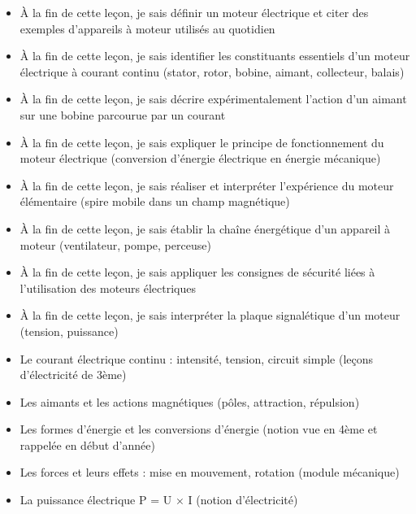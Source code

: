 \documentclass[11pt]{article}
\begin{document}
\begin{objectifs}
\begin{itemize}
\item À la fin de cette leçon, je sais définir un moteur électrique et citer des exemples d'appareils à moteur utilisés au quotidien
\item À la fin de cette leçon, je sais identifier les constituants essentiels d'un moteur électrique à courant continu (stator, rotor, bobine, aimant, collecteur, balais)
\item À la fin de cette leçon, je sais décrire expérimentalement l'action d'un aimant sur une bobine parcourue par un courant
\item À la fin de cette leçon, je sais expliquer le principe de fonctionnement du moteur électrique (conversion d'énergie électrique en énergie mécanique)
\item À la fin de cette leçon, je sais réaliser et interpréter l'expérience du moteur élémentaire (spire mobile dans un champ magnétique)
\item À la fin de cette leçon, je sais établir la chaîne énergétique d'un appareil à moteur (ventilateur, pompe, perceuse)
\item À la fin de cette leçon, je sais appliquer les consignes de sécurité liées à l'utilisation des moteurs électriques
\item À la fin de cette leçon, je sais interpréter la plaque signalétique d'un moteur (tension, puissance)
\end{itemize}
\end{objectifs}

\begin{prerequis}
\begin{itemize}
\item Le courant électrique continu : intensité, tension, circuit simple (leçons d'électricité de 3ème)
\item Les aimants et les actions magnétiques (pôles, attraction, répulsion)
\item Les formes d'énergie et les conversions d'énergie (notion vue en 4ème et rappelée en début d'année)
\item Les forces et leurs effets : mise en mouvement, rotation (module mécanique)
\item La puissance électrique P = U × I (notion d'électricité)
\end{itemize}
\end{prerequis}

\newpage
\end{document}
